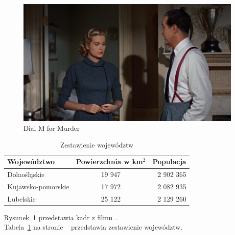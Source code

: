 \documentclass{article}
\begin{document}
\begin{figure}[h!]
\centering
\includegraphics[scale=0.3]{DialMforMurder}
\caption{Dial M for Murder}
\label{fig:murder}
\end{figure}
% 
\begin{center}
    \begin{longtable}{|l | c | r|}
     \caption{Zestawienie województw} 
      \label{tab:woj} \\ \hline
        Województwo & Powierzchnia w km$^{2}$ & Populacja \\ \hline
        \endhead
        Dolnośląskie & 19 947 & 2 902 365 \\ \hline
        Kujawsko-pomorskie & 17 972 & 2 082 935 \\ \hline
        Lubelskie & 25 122 & 2 129 260 \\
        \hline
       
    \end{longtable}
\end{center}

Rysunek~\ref{fig:murder} przedstawia kadr z filmu~\pageref{fig:murder}.~\\
Tabela~\ref{tab:woj}  na stronie ~\pageref{tab:woj} przedstawia zestawienie województw.
\end{document}
